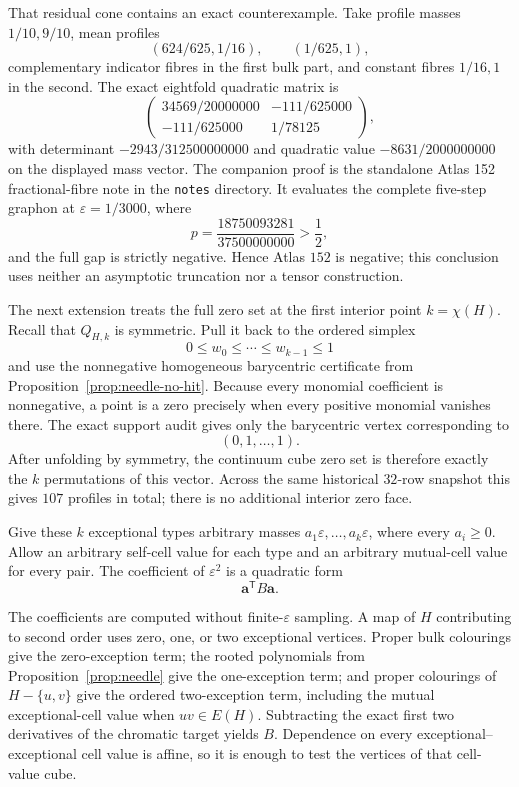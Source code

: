 \documentclass[11pt]{article}
\begin{document}
That residual cone contains an exact counterexample.  Take profile masses
$1/10,9/10$, mean profiles
\[
 (624/625,1/16),\qquad(1/625,1),
\]
complementary indicator fibres in the first bulk part, and constant fibres
$1/16,1$ in the second.  The exact eightfold quadratic matrix is
\[
 \begin{pmatrix}
 34569/20000000&-111/625000\\
 -111/625000&1/78125
 \end{pmatrix},
\]
with determinant $-2943/312500000000$ and quadratic value
$-8631/2000000000$ on the displayed mass vector.  The companion proof is the
standalone Atlas 152 fractional-fibre note in the \texttt{notes} directory.  It
evaluates the complete five-step graphon at $\varepsilon=1/3000$, where
\[
 p=\frac{18750093281}{37500000000}>\frac12,
\]
and the full gap is strictly negative.  Hence
Atlas $152$ is negative; this conclusion uses neither an asymptotic truncation
nor a tensor construction.

The next extension treats the full zero set at the first interior point
$k=\chi(H)$.  Recall that $Q_{H,k}$ is symmetric.  Pull it back to the
ordered simplex
\[
 0\leq w_0\leq\cdots\leq w_{k-1}\leq1
\]
and use the nonnegative homogeneous barycentric certificate from
Proposition~\ref{prop:needle-no-hit}.  Because every monomial coefficient is
nonnegative, a point is a zero precisely when every positive monomial
vanishes there.  The exact support audit gives only the barycentric vertex
corresponding to
\[
 (0,1,\ldots,1).
\]
After unfolding by symmetry, the continuum cube zero set is therefore
exactly the $k$ permutations of this vector.  Across the same historical
$32$-row snapshot this gives $107$ profiles in total; there is no additional
interior zero face.

Give these $k$ exceptional types arbitrary masses
$a_1\varepsilon,\ldots,a_k\varepsilon$, where every $a_i\geq0$.  Allow an
arbitrary self-cell value for each type and an arbitrary mutual-cell value
for every pair.  The coefficient of $\varepsilon^2$ is a quadratic form
\begin{equation}
 \boldsymbol a^{\mathsf T}B\boldsymbol a.
 \label{eq:full-profile-copositive}
\end{equation}

The coefficients are computed without finite-$\varepsilon$ sampling.  A map
of $H$ contributing to second order uses zero, one, or two exceptional
vertices.  Proper bulk colourings give the zero-exception term; the rooted
polynomials from Proposition~\ref{prop:needle} give the one-exception term;
and proper colourings of $H-\{u,v\}$ give the ordered two-exception term,
including the mutual exceptional-cell value when $uv\in E(H)$.  Subtracting
the exact first two derivatives of the chromatic target yields
$B$.  Dependence on every exceptional--exceptional cell value is affine, so
it is enough to test the vertices of that cell-value cube.
\end{document}
